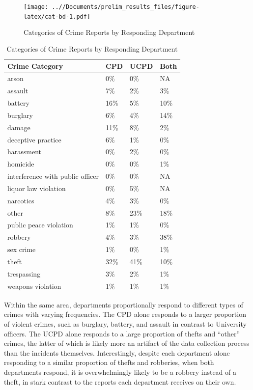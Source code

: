\documentclass{ucetd}
\begin{document}
\begin{figure}
\centering
\texttt{[image: ..//Documents/prelim\_results\_files/figure-latex/cat-bd-1.pdf]}
\caption{Categories of Crime Reports by Responding Department}
\end{figure}

\begin{table}

\caption{\label{tab:cat-dept-tab}Categories of Crime Reports by Responding Department}
\centering
\begin{tabular}[t]{l|l|l|l}
\hline
Crime Category & CPD & UCPD & Both\\
\hline
arson & 0\% & 0\% & NA\\
\hline
assault & 7\% & 2\% & 3\%\\
\hline
battery & 16\% & 5\% & 10\%\\
\hline
burglary & 6\% & 4\% & 14\%\\
\hline
damage & 11\% & 8\% & 2\%\\
\hline
deceptive practice & 6\% & 1\% & 0\%\\
\hline
harassment & 0\% & 2\% & 0\%\\
\hline
homicide & 0\% & 0\% & 1\%\\
\hline
interference with public officer & 0\% & 0\% & NA\\
\hline
liquor law violation & 0\% & 5\% & NA\\
\hline
narcotics & 4\% & 3\% & 0\%\\
\hline
other & 8\% & 23\% & 18\%\\
\hline
public peace violation & 1\% & 1\% & 0\%\\
\hline
robbery & 4\% & 3\% & 38\%\\
\hline
sex crime & 1\% & 0\% & 1\%\\
\hline
theft & 32\% & 41\% & 10\%\\
\hline
trespassing & 3\% & 2\% & 1\%\\
\hline
weapons violation & 1\% & 1\% & 1\%\\
\hline
\end{tabular}
\end{table}

Within the same area, departments proportionally respond to different
types of crimes with varying frequencies. The CPD alone responds to a
larger proportion of violent crimes, such as burglary, battery, and
assault in contrast to University officers. The UCPD alone responds to a
large proportion of thefts and ``other'' crimes, the latter of which is
likely more an artifact of the data collection process than the
incidents themselves. Interestingly, despite each department alone
responding to a similar proportion of thefts and robberies, when both
departments respond, it is overwhelmingly likely to be a robbery instead
of a theft, in stark contrast to the reports each department receives on
their own.
\end{document}
